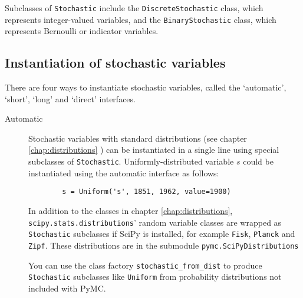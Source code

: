 Subclasses of \texttt{Stochastic} include the \texttt{DiscreteStochastic} class, which represents integer-valued variables, and the \texttt{BinaryStochastic} class, which represents Bernoulli or indicator variables. 

\subsection{Instantiation of stochastic variables}
There are four ways to instantiate stochastic variables, called the `automatic', `short', `long' and `direct' interfaces.

\begin{description}    
    \item[Automatic] Stochastic variables with standard distributions (see chapter \ref{chap:distributions} ) can be instantiated in a single line using special subclasses of \texttt{Stochastic}. Uniformly-distributed variable $s$ could be instantiated using the automatic interface as follows:
    \begin{verbatim}
        s = Uniform('s', 1851, 1962, value=1900)
    \end{verbatim}

    In addition to the classes in chapter \ref{chap:distributions}, \texttt{scipy.stats.distributions}' random variable classes are wrapped as \texttt{Stochastic} subclasses if SciPy is installed, for example \texttt{Fisk}, \texttt{Planck} and \texttt{Zipf}. These distributions are in the submodule \texttt{pymc.SciPyDistributions}

    You can use the class factory \texttt{stochastic_from_dist} to produce \texttt{Stochastic} subclasses like \texttt{Uniform} from probability distributions not included with PyMC.%
    

\end{description}
